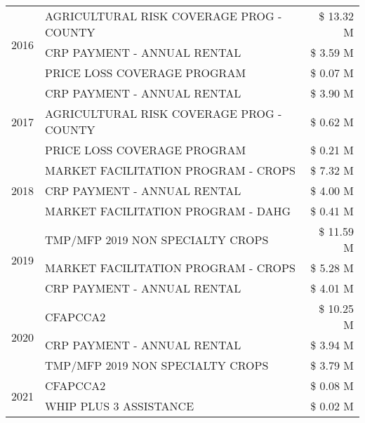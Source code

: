 \begin{tabular}{llr}
\cline{1-3}
\multirow[t]{3}{*}{2016} & AGRICULTURAL RISK COVERAGE PROG - COUNTY      & \$ 13.32 M \\
 & CRP PAYMENT - ANNUAL RENTAL                   & \$ 3.59 M \\
 & PRICE LOSS COVERAGE PROGRAM                   & \$ 0.07 M \\
\cline{1-3}
\multirow[t]{3}{*}{2017} & CRP PAYMENT - ANNUAL RENTAL & \$ 3.90 M \\
 & AGRICULTURAL RISK COVERAGE PROG - COUNTY & \$ 0.62 M \\
 & PRICE LOSS COVERAGE PROGRAM & \$ 0.21 M \\
\cline{1-3}
\multirow[t]{3}{*}{2018} & MARKET FACILITATION PROGRAM - CROPS & \$ 7.32 M \\
 & CRP PAYMENT - ANNUAL RENTAL & \$ 4.00 M \\
 & MARKET FACILITATION PROGRAM - DAHG & \$ 0.41 M \\
\cline{1-3}
\multirow[t]{3}{*}{2019} & TMP/MFP 2019 NON SPECIALTY CROPS & \$ 11.59 M \\
 & MARKET FACILITATION PROGRAM - CROPS & \$ 5.28 M \\
 & CRP PAYMENT - ANNUAL RENTAL & \$ 4.01 M \\
\cline{1-3}
\multirow[t]{3}{*}{2020} & CFAPCCA2 & \$ 10.25 M \\
 & CRP PAYMENT - ANNUAL RENTAL & \$ 3.94 M \\
 & TMP/MFP 2019 NON SPECIALTY CROPS & \$ 3.79 M \\
\cline{1-3}
\multirow[t]{2}{*}{2021} & CFAPCCA2 & \$ 0.08 M \\
 & WHIP PLUS 3 ASSISTANCE & \$ 0.02 M \\
\cline{1-3}
\bottomrule
\end{tabular}
